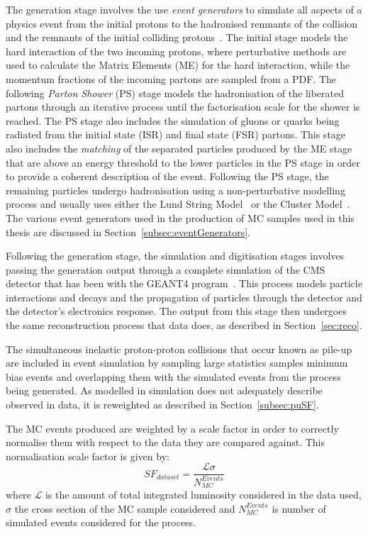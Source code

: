 The generation stage involves the use \emph{event generators} to simulate all aspects of a physics event from the initial protons to the hadronised remnants of the collision and the remnants of the initial colliding protons~\cite{Buckley:2011ms,Hoche:2014rga}.
The initial stage models the hard interaction of the two incoming protons, where perturbative methods are used to calculate the Matrix Elements (ME) for the hard interaction, while the momentum fractions of the incoming partons are sampled from a PDF.
The following \emph{Parton Shower} (PS) stage models the hadronisation of the liberated partons through an iterative process until the factorisation scale for the shower is reached.
The PS stage also includes the simulation of gluons or quarks being radiated from the initial state (ISR) and final state (FSR) partons.
This stage also includes the \emph{matching} of the separated particles produced by the ME stage that are above an energy threshold to the lower \pT particles in the PS stage in order to provide a coherent description of the event.
Following the PS stage, the remaining particles undergo hadronisation using a non-perturbative modelling process and usually uses either the Lund String Model~\cite{Andersson:1983ia} or the Cluster Model~\cite{Winter:2003tt}.
The various event generators used in the production of MC samples used in this thesis are discussed in Section~\ref{subsec:eventGenerators}.

Following the generation stage, the simulation and digitisation stages involves passing the generation output through a complete simulation of the CMS detector that has been with the GEANT4 program~\cite{geant4,Lefebure:1999wja}.
This process models particle interactions and decays and the propagation of particles through the detector and the detector's electronics response.
The output from this stage then undergoes the same reconstruction process that data does, as described in Section~\ref{sec:reco}.

The simultaneous inelastic proton-proton collisions that occur known as pile-up are included in event simulation by sampling large statistics samples minimum bias events and overlapping them with the simulated events from the process being generated.
As \PU modelled in simulation does not adequately describe observed \PU in data, it is reweighted as described in Section~\ref{subsec:puSF}.

The MC events produced are weighted by a scale factor in order to correctly normalise them with respect to the data they are compared against.
This normalisation scale factor is given by:
\begin{equation}
SF_{dataset} = \frac{\mathcal{L} \sigma}{N_{MC}^{Events}}
\end{equation}
where $\mathcal{L}$ is the amount of total integrated luminosity considered in the data used, $\sigma$ the cross section of the MC sample considered and $N_{MC}^{Events}$ is number of simulated events considered for the process.


